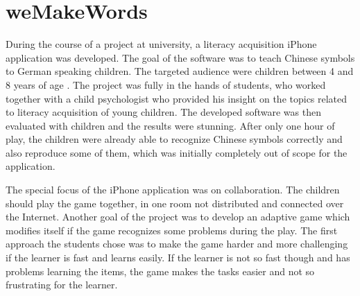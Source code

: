 \section{weMakeWords}
During the course of a project at university, a literacy acquisition iPhone application
was developed. The goal of the software was to teach Chinese symbols to German
speaking children. The targeted audience were children between 4 and 8 years of age \cite{Ismailovic2009}. The
project was fully in the hands of students, who worked together with a child
psychologist who provided his insight on the topics related to literacy
acquisition of young children. The developed software was then evaluated with
children and the results were stunning. After only one hour of play, the
children were already able to recognize Chinese symbols correctly and also
reproduce some of them, which was initially completely out of scope for the
application.

The special focus of the iPhone application was on collaboration. The children
should play the game together, in one room not distributed and connected over
the Internet. Another goal of the project was to develop an adaptive game
which modifies itself if the game recognizes some problems during the play.
The first approach the students chose was to make the game harder and more challenging if
the learner is fast and learns easily. If the learner is not so fast though
and has problems learning the items, the game makes the tasks easier and not
so frustrating for the learner. 
